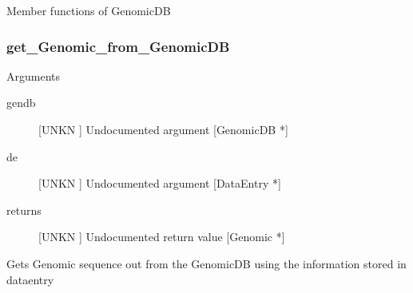 Member functions of GenomicDB

\subsubsection{get_Genomic_from_GenomicDB}

Arguments
\begin{description}
\item[gendb] [UNKN ] Undocumented argument [GenomicDB *]
\item[de] [UNKN ] Undocumented argument [DataEntry *]
\item[returns] [UNKN ] Undocumented return value [Genomic *]
\end{description}
Gets Genomic sequence out from
the GenomicDB using the information stored in
dataentry



